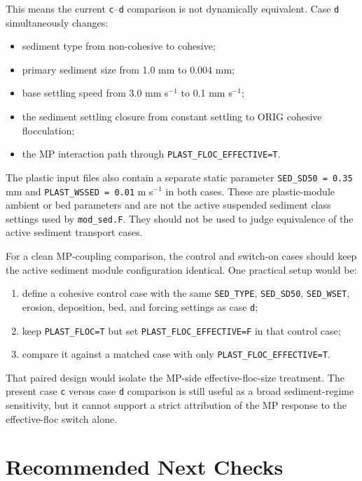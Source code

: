 \documentclass[11pt]{article}
\begin{document}
This means the current \texttt{c}--\texttt{d} comparison is not dynamically
equivalent.  Case \texttt{d} simultaneously changes:
\begin{itemize}
  \item sediment type from non-cohesive to cohesive;
  \item primary sediment size from 1.0 mm to 0.004 mm;
  \item base settling speed from 3.0 mm s$^{-1}$ to 0.1 mm s$^{-1}$;
  \item the sediment settling closure from constant settling to ORIG cohesive
        flocculation;
  \item the MP interaction path through \texttt{PLAST\_FLOC\_EFFECTIVE=T}.
\end{itemize}

The plastic input files also contain a separate static parameter
\texttt{SED\_SD50 = 0.35} mm and \texttt{PLAST\_WSSED = 0.01} m s$^{-1}$ in
both cases.  These are plastic-module ambient or bed parameters and are not the
active suspended sediment class settings used by \texttt{mod\_sed.F}.  They
should not be used to judge equivalence of the active sediment transport cases.

For a clean MP-coupling comparison, the control and switch-on cases should keep
the active sediment module configuration identical.  One practical setup would
be:
\begin{enumerate}
  \item define a cohesive control case with the same \texttt{SED\_TYPE},
        \texttt{SED\_SD50}, \texttt{SED\_WSET}, erosion, deposition, bed, and
        forcing settings as case \texttt{d};
  \item keep \texttt{PLAST\_FLOC=T} but set
        \texttt{PLAST\_FLOC\_EFFECTIVE=F} in that control case;
  \item compare it against a matched case with only
        \texttt{PLAST\_FLOC\_EFFECTIVE=T}.
\end{enumerate}
That paired design would isolate the MP-side effective-floc-size treatment.
The present case \texttt{c} versus case \texttt{d} comparison is still useful as
a broad sediment-regime sensitivity, but it cannot support a strict
attribution of the MP response to the effective-floc switch alone.

\section*{Recommended Next Checks}
\end{document}
